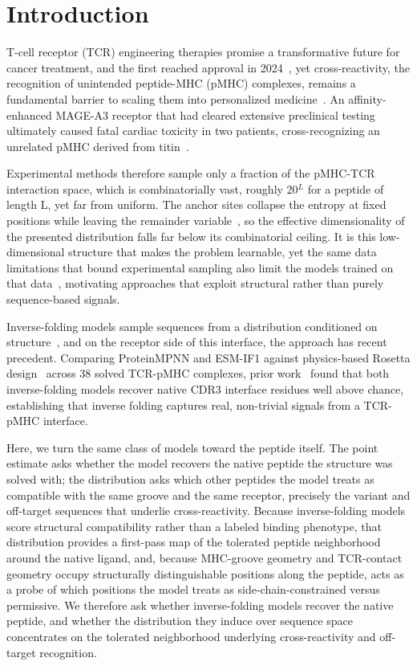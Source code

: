 \documentclass[letterpaper]{article}
\begin{document}
\section{Introduction}
T-cell receptor (TCR) engineering therapies promise a transformative future for cancer treatment, and the first reached approval in 2024~\citep{fda2024tecelra,hong2023mage}, yet cross-reactivity, the recognition of unintended peptide-MHC (pMHC) complexes, remains a fundamental barrier to scaling them into personalized medicine~\citep{mason1998crossreactivity,wooldridge2012million}. An affinity-enhanced MAGE-A3 receptor that had cleared extensive preclinical testing ultimately caused fatal cardiac toxicity in two patients, cross-recognizing an unrelated pMHC derived from titin~\citep{linette2013cardiovascular,cameron2013titin}.

Experimental methods therefore sample only a fraction of the pMHC-TCR interaction space, which is combinatorially vast, roughly 
20$^L$  for a peptide of length L, yet far from uniform.
The anchor sites collapse the entropy at fixed positions while leaving the remainder variable~\citep{falk1991allele,rammensee1999syfpeithi}, so the effective dimensionality of the presented distribution falls far below its combinatorial ceiling. It is this low-dimensional structure that makes the problem learnable, yet the same data limitations that bound experimental sampling also limit the models trained on that data~\citep{odonnell2020mhcflurry,reynisson2020netmhcpan}, motivating approaches that exploit structural rather than purely sequence-based signals.

Inverse-folding models sample sequences from a distribution conditioned on structure~\citep{dauparas2022proteinmpnn,hsu2022esmif}, and on the receptor side of this interface, the approach has recent precedent. Comparing ProteinMPNN and ESM-IF1 against physics-based Rosetta design~\citep{alford2017rosetta} across 38 solved TCR-pMHC complexes, prior work~\citep{ribeirofilho2024exploring} found that both inverse-folding models recover native CDR3 interface residues well above chance, establishing that inverse folding captures real, non-trivial signals from a TCR-pMHC interface.

Here, we turn the same class of models toward the peptide itself. The point estimate asks whether the model recovers the native peptide the structure was solved with; the distribution asks which other peptides the model treats as compatible with the same groove and the same receptor, precisely the variant and off-target sequences that underlie cross-reactivity. Because inverse-folding models score structural compatibility rather than a labeled binding phenotype, that distribution provides a first-pass map of the tolerated peptide neighborhood around the native ligand, and, because MHC-groove geometry and TCR-contact geometry occupy structurally distinguishable positions along the peptide, acts as a probe of which positions the model treats as side-chain-constrained versus permissive.
We therefore ask whether inverse-folding models recover the native peptide, and whether the distribution they induce over sequence space concentrates on the tolerated neighborhood underlying cross-reactivity and off-target recognition.
\end{document}
